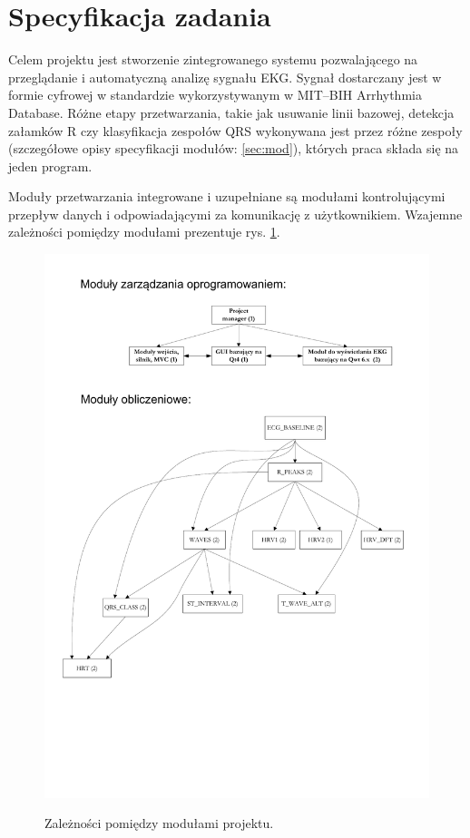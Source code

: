 \documentclass[a4paper, 11pt]{article}
\begin{document}
\setcounter{page}{2}
\tableofcontents
\newpage

\section{Specyfikacja zadania}

Celem projektu jest stworzenie zintegrowanego systemu pozwalającego na przeglądanie i automatyczną analizę sygnału EKG. Sygnał dostarczany jest w formie cyfrowej w standardzie wykorzystywanym w MIT–BIH Arrhythmia Database. Różne etapy przetwarzania, takie jak usuwanie linii bazowej, detekcja załamków R czy klasyfikacja zespołów QRS wykonywana jest przez różne zespoły (szczegółowe opisy specyfikacji modułów: \ref{sec:mod}), których praca składa się na jeden program.

Moduły przetwarzania integrowane i uzupełniane są modułami kontrolującymi przepływ danych i odpowiadającymi za komunikację z użytkownikiem. Wzajemne zależności pomiędzy modułami prezentuje rys. \ref{fig:zaleznosci}.

\begin{figure}[h!]
  \centering
  \includegraphics[width=0.7\linewidth]{include/Projekt_zaleznosci}
  \label{fig:zaleznosci}
  \caption{Zależności pomiędzy modułami projektu.}
\end{figure}
\end{document}
